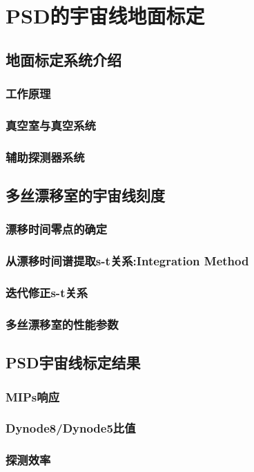 \chapter{PSD的宇宙线地面标定}
\section{地面标定系统介绍}
\subsection{工作原理}
\subsection{真空室与真空系统}
\subsection{辅助探测器系统}

\section{多丝漂移室的宇宙线刻度}
\subsection{漂移时间零点的确定}
\subsection{从漂移时间谱提取s-t关系:Integration Method}
\subsection{迭代修正s-t关系}
\subsection{多丝漂移室的性能参数}

\section{PSD宇宙线标定结果}
\subsection{MIPs响应}
\subsection{Dynode8/Dynode5比值}
\subsection{探测效率}
